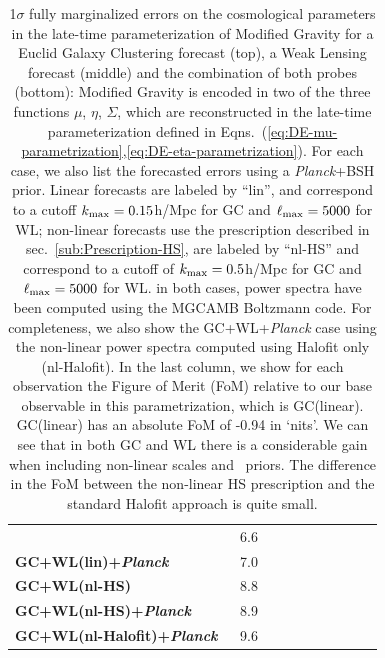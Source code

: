\begin{table}[htbp]
\begin{tabular}{|l|c|c|c|c|c||c|c|c|c|}
 
& 6.6 \tabularnewline
\Tstrut \textbf{GC+WL(lin)+{\it Planck}} $\;$  
 
& 7.0  \tabularnewline
\hline
\hline
 \Tstrut \textbf{GC+WL(nl-HS)}  
 
& 8.8 \tabularnewline
\Tstrut \textbf{GC+WL(nl-HS)+{\it Planck}} $\;$  
 
& 8.9  \tabularnewline
\Tstrut \textbf{GC+WL(nl-Halofit)+{\it Planck}} $\;$ 

& 9.6  \tabularnewline
\hline  
\end{tabular}\protect
\small
\caption[1$\sigma$ marginalized errors for a Euclid GC and WL forecast in the late-time parameterization.]{\label{tab:errors-Euclid-GC-WL-late_time}
1$\sigma$
fully marginalized errors on the cosmological parameters in the late-time parameterization of Modified Gravity for a Euclid
Galaxy Clustering forecast (top), a Weak Lensing forecast (middle) and the combination
of both probes (bottom): 
Modified Gravity is encoded in two of the three functions $\mu$, $\eta$, $\Sigma$, 
which are reconstructed in the late-time parameterization defined in 
Eqns.\ (\ref{eq:DE-mu-parametrization},\ref{eq:DE-eta-parametrization}). For each case, we also list
the forecasted errors using a {\it Planck}+BSH prior.
Linear forecasts are labeled by ``lin'', and correspond to a cutoff $k_{\rm max}=0.15$h/Mpc for GC and $\ell_{\rm max}=5000$ for WL; 
non-linear forecasts use the prescription described in 
sec.\ \ref{sub:Prescription-HS}, are labeled by ``nl-HS'' and correspond to a cutoff of $k_{\rm max}=0.5$h/Mpc for GC and $\ell_{\rm max}=5000$ for WL.
in both cases, power spectra have been computed using the MGCAMB Boltzmann code. For completeness,
we also show the GC+WL+{\it Planck} case using the non-linear power spectra computed using Halofit only (nl-Halofit).
In the last column, we show for each observation the Figure of Merit (FoM) 
relative to our base observable in this parametrization, which is GC(linear).
GC(linear) has an absolute FoM of -0.94 in `nits'.
We can see that in both GC and WL there is a considerable gain when including non-linear scales and \planck\ priors.
The difference in the FoM between the non-linear HS prescription and the standard Halofit approach
is quite small. 
}
\end{table}
\normalsize

